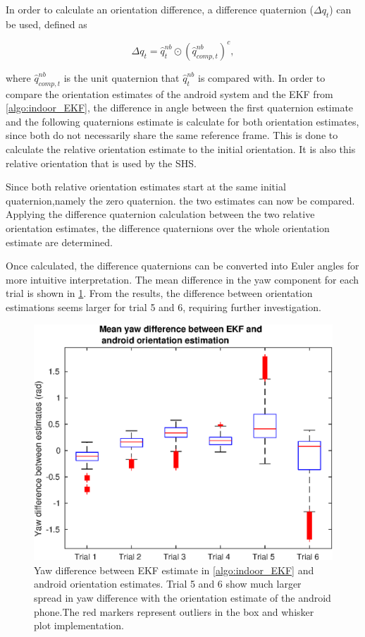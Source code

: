 In order to calculate an orientation difference, a difference quaternion ($	\Delta q_t$) can be used, defined as \cite{Kok2017}

\begin{equation}
	\Delta q_t = \hat{q}_{t}^{nb} \odot \left( \hat{q}_{comp,t}^{nb}  \right)^c,
\end{equation} 

where $\hat{q}_{comp,t}^{nb}$ is the unit quaternion that $ \hat{q}_{t}^{nb} $ is compared with.  In order to compare the orientation estimates of the android system and the EKF from \cref{algo:indoor_EKF}, the difference in angle between the first quaternion estimate and the following quaternions estimate is calculate for both orientation estimates, since both do not necessarily share the same reference frame. This is done to calculate the relative orientation estimate to the initial orientation. It is also this relative orientation that is used by the \ac{SHS}.\par 

Since both relative orientation estimates start at the same initial quaternion,namely the zero quaternion. the two estimates can now be compared. Applying the difference quaternion calculation between the two relative orientation estimates, the difference quaternions over the whole orientation estimate are determined.  \par 

Once calculated, the difference quaternions can be converted into Euler angles for more intuitive interpretation. The mean difference in the yaw component for each trial is shown in  \cref{fig:yaw_difference_between_android_and_ekf_1}. From the results, the difference between orientation estimations seems larger for trial 5 and 6, requiring further investigation.

\begin{figure}[H]
	\centering
	\includegraphics[width=0.7\linewidth]{images/20201201_1212_Mean_yaw_difference_between_EKF_android_1}
	\setlength{\belowcaptionskip}{-10pt}
	\caption{Yaw difference between EKF estimate in \cref{algo:indoor_EKF} and android orientation estimates. Trial 5 and 6 show much larger spread in yaw difference with the orientation estimate of the android phone.The red markers represent outliers in the box and whisker plot implementation.}
	\label{fig:yaw_difference_between_android_and_ekf_1}
\end{figure}


